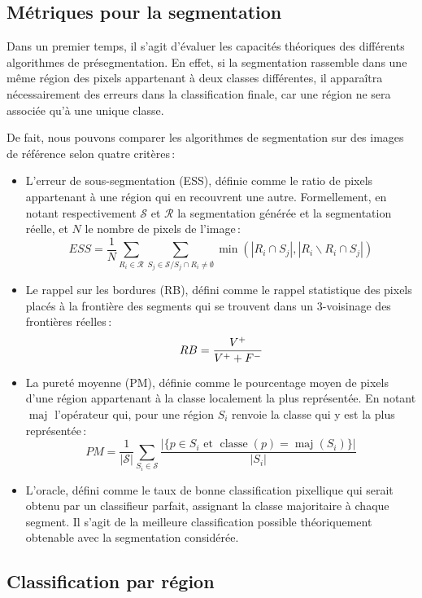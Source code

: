\subsection{Métriques pour la segmentation}

Dans un premier temps, il s'agit d'évaluer les capacités théoriques des différents algorithmes de présegmentation. En effet, si la segmentation rassemble dans une même région des pixels appartenant à deux classes différentes, il apparaîtra nécessairement des erreurs dans la classification finale, car une région ne sera associée qu'à une unique classe.

De fait, nous pouvons comparer les algorithmes de segmentation sur des images de référence selon quatre critères\,:
\begin{itemize}
  \item L'erreur de sous-segmentation (ESS), définie comme le ratio de pixels appartenant à une région qui en recouvrent une autre. Formellement, en notant respectivement $\mathcal{S}$ et $\mathcal{R}$ la segmentation générée et la segmentation réelle, et $N$ le nombre de pixels de l'image\,:
  $$ESS = \frac{1}{N} \sum_{R_i \in \mathcal{R}} \sum_{S_j \in \mathcal{S} / S_j \cap R_i \neq \emptyset} \operatorname{min}(\left|R_i \cap S_j\right|, \left|R_i \backslash R_i \cap S_j\right|)$$
  \item Le rappel sur les bordures (RB), défini comme le rappel statistique des pixels placés à la frontière des segments qui se trouvent dans un 3-voisinage des frontières réelles\,:
  $$RB =  \frac{V^+}{V^+ + F^-}$$
  \item La pureté moyenne (PM), définie comme le pourcentage moyen de pixels d'une région appartenant à la classe localement la plus représentée. En notant $\operatorname{maj}$ l'opérateur qui, pour une région $S_i$ renvoie la classe qui y est la plus représentée\,:
  $$PM = \frac{1}{\left| \mathcal{S} \right|} \sum_{S_i \in \mathcal{S}} \frac{\left| \{ p \in S_i \text{ et } \operatorname{classe}(p) = \operatorname{maj}(S_i) \}\right|}{\left| S_i \right|}$$
  \item L'oracle, défini comme le taux de bonne classification pixellique qui serait obtenu par un classifieur parfait, assignant la classe majoritaire à chaque segment. Il s'agit de la meilleure classification possible théoriquement obtenable avec la segmentation considérée.
\end{itemize}

\subsection{Classification par région}
\label{sec:results_region}

